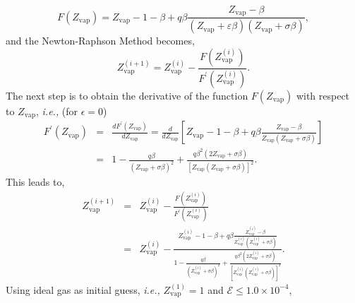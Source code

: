 \documentclass[12pts,a4paper,amsmath,amssymb,floatfix]{article}%
\newcommand{\frc}{\displaystyle\frac}
\newcommand{\ie}{{\it i.e., }}
\begin{document}
\begin{enumerate}[1)]
\begin{enumerate}[a)]
\begin{displaymath}
                     F\left(Z_{\text{vap}}\right) = Z_{\text{vap}} - 1 - \beta + q\beta \frc{Z_{\text{vap}} - \beta} {\left(Z_{\text{vap}}+\varepsilon\beta\right)\left(Z_{\text{vap}} +\sigma\beta\right)},
                  \end{displaymath}
                  and the Newton-Raphson Method becomes,
                  \begin{displaymath}
                     Z_{\text{vap}}^{(i+1)} = Z_{\text{vap}}^{(i)} - \frc{F\left(Z_{\text{vap}}^{(i)}\right)}{F^{\prime}\left(Z_{\text{vap}}^{(i)}\right)}.
                  \end{displaymath}
                  The next step is to obtain the derivative of the function $F\left(Z_{\text{vap}}\right)$ with respect to $Z_{\text{vap}}$, \ie (for $\epsilon=0$)
                  \begin{eqnarray}
                     F^{\prime}\left(Z_{\text{vap}}\right) &=& \frc{d F^{\prime}\left(Z_{\text{vap}}\right)}{d Z_{\text{vap}}} = \frc{d}{dZ_{\text{vap}}} \left[Z_{\text{vap}} - 1 - \beta + q\beta \frc{Z_{\text{vap}}-\beta}{Z_{\text{vap}}\left(Z_{\text{vap}}+\sigma\beta\right)}\right]\nonumber \\
                                                       &=& 1 - \frc{q\beta}{\left(Z_{\text{vap}}+\sigma\beta\right)^{2}} + \frc{q\beta^{2}\left(2Z_{\text{vap}}+\sigma\beta\right)}{\left[Z_{\text{vap}}\left(Z_{\text{vap}}+\sigma\beta\right)\right]^{2}}. \nonumber
                  \end{eqnarray}
                  This leads to,
                  \begin{eqnarray}
                     Z_{\text{vap}}^{(i+1)} &=& Z_{\text{vap}}^{(i)} - \frc{F\left(Z_{\text{vap}}^{(i)}\right)}{F^{\prime}\left(Z_{\text{vap}}^{(i)}\right)} \nonumber \\
                     &=& Z_{\text{vap}}^{(i)} - \frc{Z_{\text{vap}}^{(i)} - 1 - \beta + q\beta \frc{Z_{\text{vap}}^{(i)} - \beta} {Z_{\text{vap}}^{(i)}\left(Z_{\text{vap}}^{(i)} +\sigma\beta\right)}}{1 - \frc{q\beta}{\left(Z_{\text{vap}}^{(i)}+\sigma\beta\right)^{2}} + \frc{q\beta^{2}\left(2Z_{\text{vap}}^{(i)}+\sigma\beta\right)}{\left[Z_{\text{vap}}^{(i)}\left(Z_{\text{vap}}^{(i)}+\sigma\beta\right)\right]^{2}}}. \nonumber
                  \end{eqnarray}
                  Using ideal gas as initial guess, \ie $Z_{\text{vap}}^{(1)}=1$ and $\mathcal{E} \leq 1.0\times 10^{-4}$,
                 \begin{center}
                     \begin{tabular}{c c c c}

\end{tabular}
\end{center}
\end{enumerate}
\end{enumerate}
\end{document}
